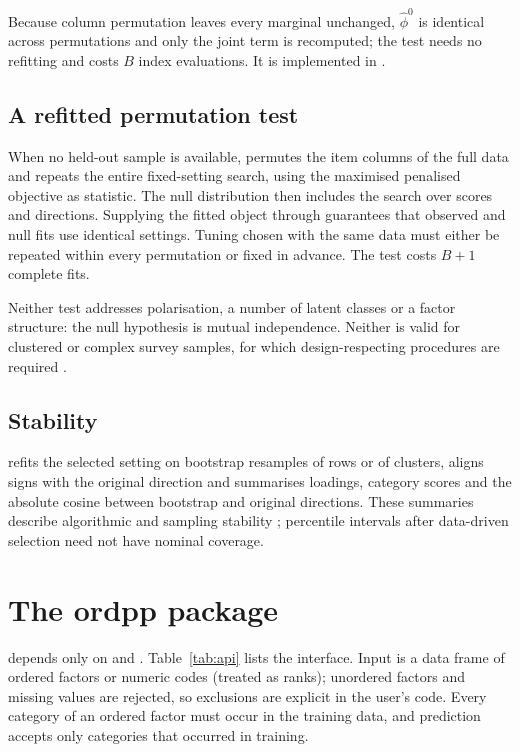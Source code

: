 Because column permutation leaves every marginal unchanged, $\widehat\phi^0$ is identical across permutations and only the joint term is recomputed; the test needs no refitting and costs $B$ index evaluations. It is implemented in .

\subsection{A refitted permutation test}
When no held-out sample is available,  permutes the item columns of the full data and repeats the entire fixed-setting search, using the maximised penalised objective as statistic. The null distribution then includes the search over scores and directions. Supplying the fitted object through  guarantees that observed and null fits use identical settings. Tuning chosen with the same data must either be repeated within every permutation or fixed in advance. The test costs $B+1$ complete fits.

Neither test addresses polarisation, a number of latent classes or a factor structure: the null hypothesis is mutual independence. Neither is valid for clustered or complex survey samples, for which design-respecting procedures are required \citep{rao1988}.

\subsection{Stability}
 refits the selected setting on bootstrap resamples of rows or of clusters, aligns signs with the original direction and summarises loadings, category scores and the absolute cosine between bootstrap and original directions. These summaries describe algorithmic and sampling stability \citep{meinshausen2010}; percentile intervals after data-driven selection need not have nominal coverage.

\section{The ordpp package}
 \citep{ordpp} depends only on  and . Table~\ref{tab:api} lists the interface. Input is a data frame of ordered factors or numeric codes (treated as ranks); unordered factors and missing values are rejected, so exclusions are explicit in the user's code. Every category of an ordered factor must occur in the training data, and prediction accepts only categories that occurred in training.

